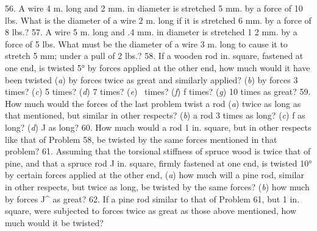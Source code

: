 56. A wire 4 m. long and 2 mm. in diameter is stretched 5 mm. by a force of 10 lbs. What is the diameter of a wire 2 m. long if it is stretched 6 mm. by a force of 8 lbs.?
57. A wire 5 m. long and .4 mm. in diameter is stretched 1 2 mm. by a force of 5 lbs. What must be the diameter of a wire 3 m. long to cause it to stretch 5 mm; under a pull of 2 lbs.?
58. If a wooden rod \frac{}{} in. square, fastened at one end, is twisted 5° by forces applied at the other end, how much would it have been twisted (\emph{a}) by forces twice as great and similarly applied? (\emph{b}) by forces 3 times? (\emph{c}) 5 times? (\emph{d}) 7 times? (\emph{e}) \ times? (\emph{f}) f times? (\emph{g}) 10 times as great?
59. How much would the forces of the last problem twist a rod (\emph{a}) twice as long as that mentioned, but similar in other respects? (\emph{b}) a rod 3 times as long? (\emph{c}) f as long? (\emph{d}) J as long?
60. How much would a rod 1 in. square, but in other respects like that of Problem 58, be twisted by the same forces mentioned in that problem?
61. Assuming that the torsional stiffness of spruce wood is twice that of pine, and that a spruce rod J in. square, firmly fastened at one end, is twisted 10° by certain forces applied at the other end, (\emph{a}) how much will a pine rod, similar in other respects, but twice as long, be twisted by the same forces? (\emph{b}) how much by forces J^ as great?
62. If a pine rod similar to that of Problem 61, but 1 in. square, were subjected to forces twice as great as those above mentioned, how much would it be twisted?